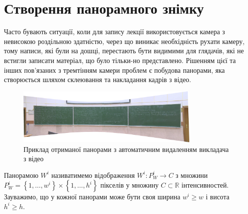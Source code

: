 \section{Створення панорамного знімку}

Часто бувають ситуації, коли для запису лекції використовується камера з
невисокою роздільною здатністю, через що виникає необхідність рухати
камеру, тому написи, які були на дошці, перестають бути видимими для
глядачів, які не встигли записати матеріал, що було тільки-но
представлено. Рішенням цієї та інших пов'язаних з тремтінням
камери проблем є побудова панорами, яка створюється шляхом склеювання
та накладання кадрів з відео.

\begin{figure}[H]
    \centering
    \includegraphics[width=0.8\textwidth]{images/panorama_example}
    \caption{Приклад отриманої панорами з автоматичним видаленням 
    викладача з відео \cite{fpmi_2021_video}
    \label{fig:panorama_example}
    }
\end{figure}

Панорамою \(W^{i}\) називатимемо відображення
\(W^{i}:P_{W}^{i} \rightarrow C\) з множини
\(P_{W}^{i} = \left\{ 1,\ldots,w^{i} \right\} \times \left\{ 1,\ldots,h^{i} \right\}\)
пікселів у множину \(C\mathbb{\subset R}\) інтенсивностей. Зауважимо, що
у кожної панорами може бути своя ширина \(w^{i} \geq w\) і висота
\(h^{i} \geq h\).


